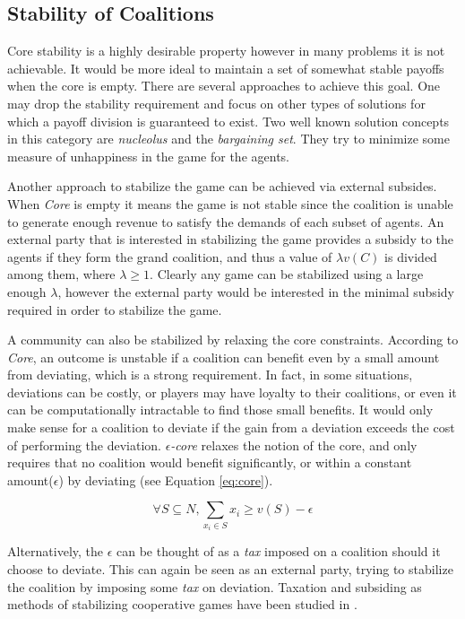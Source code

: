 \subsection{Stability of Coalitions}

Core stability is a highly desirable property however in many problems it is not achievable. It would be more ideal to maintain a set of somewhat stable payoffs when the core is empty. There are several approaches to achieve this goal. One may drop the stability requirement and focus on other types of solutions for which a payoff division is guaranteed to exist. Two well known solution concepts in this category are \emph{nucleolus}\cite{schmeidler_nucleolus_1969} and the \emph{bargaining set}\cite{Davis67existenceof}. They try to minimize some measure of unhappiness in the game for the agents.

Another approach to stabilize the game can be achieved via external subsides. When \emph{Core} is empty it means the game is not stable since the coalition is unable to generate enough revenue to satisfy the demands of each subset of agents. An external party that is interested in stabilizing the game provides a subsidy to the agents if they form the grand coalition, and thus a value of $\lambda v(C)$ is divided among them, where $\lambda \geq 1$. Clearly any game can be stabilized using a large enough $\lambda$, however the external party would be interested in the minimal subsidy required in order to stabilize the game.

A community can also be stabilized by relaxing the core constraints. According to \emph{Core}, an outcome is unstable if a coalition can benefit even by a small amount from deviating, which is a strong requirement. In fact, in some situations, deviations can be costly, or players may have loyalty to their coalitions, or even it can be computationally intractable to find those small benefits. It would only make sense for a coalition to deviate if the gain from a deviation exceeds the cost of performing the deviation. \emph{$\epsilon$-core} relaxes the notion of the core, and only requires that no coalition would benefit significantly, or within a constant amount($\epsilon$) by deviating (see Equation \ref{eq:core}).

   \begin{equation}\label{eq:core2}
       \forall S \subseteq N, \sum_{x_i \in S} x_i \geq v(S) - \epsilon
   \end{equation}

Alternatively, the $\epsilon$ can be thought of as a \emph{tax} imposed on a coalition should it choose to deviate. This can again be seen as an external party, trying to stabilize the coalition by imposing some \emph{tax} on deviation. Taxation and subsiding as methods of stabilizing cooperative games have been studied in \cite{RePEc:spr:jogath:v:38:y:2009:i:1:p:3-16, Bachrach:2009:CSC:1692490.1692502, conf/ijcai/MeirRM11}.




